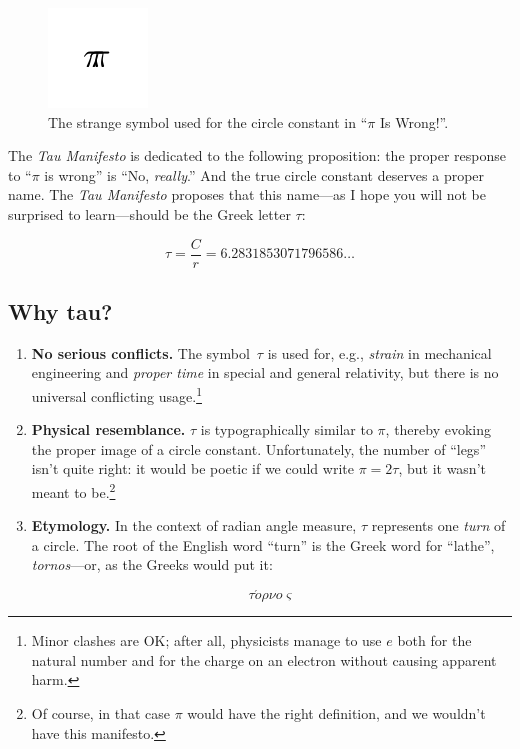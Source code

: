 \documentclass{article}
\begin{document}
\begin{figure}
\begin{center}
\includegraphics{images/figures/palais-tau.png}
\end{center}
\caption{The strange symbol used for the circle constant in ``$\pi$ Is Wrong!''.\label{fig:palais-tau}}
\end{figure}

The \emph{Tau Manifesto} is dedicated to the following proposition: the proper response to ``$\pi$ is wrong'' is ``No, \emph{really}.'' And the true circle constant deserves a proper name. The \emph{Tau Manifesto} proposes that this name---as I hope you will not be surprised to learn---should be the Greek letter $\tau$:

\[
  \tau = \frac{C}{r} = 6.2831853071796586\ldots
\]

  \subsection{Why tau?} %
  \label{sec:why_tau}
  

\begin{enumerate}
  \item \textbf{No serious conflicts.} The symbol~$\tau$ is used for, e.g., \emph{strain} in mechanical engineering and \emph{proper time} in special and general relativity, but there is no universal conflicting usage.\footnote{Minor clashes are OK; after all, physicists manage to use $e$ both for the natural number and for the charge on an electron without causing apparent harm.} 
  
  \item \textbf{Physical resemblance.} $\tau$ is typographically similar to $\pi$, thereby evoking the proper image of a circle constant. Unfortunately, the number of ``legs'' isn't quite right: it would be poetic if we could write $\pi = 2\tau$, but it wasn't meant to be.\footnote{Of course, in that case $\pi$ would have the right definition, and we wouldn't have this manifesto.}
  
  \item \textbf{Etymology.} In the context of radian angle measure, $\tau$ represents one \emph{turn} of a circle. The root of the English word ``turn'' is the Greek word for ``lathe'', \emph{tornos}---or, as the Greeks would put it: 
  
\[ \tau \acute{o}\rho\nu o\varsigma \]
  
\end{enumerate}
\end{document}
